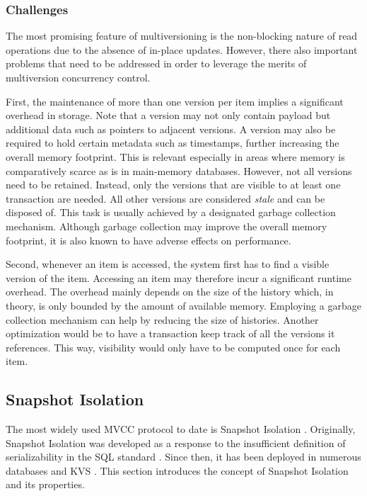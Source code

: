 \subsubsection{Challenges}

The most promising feature of multiversioning is the non-blocking nature of read
operations due to the absence of in-place updates. However, there also important
problems that need to be addressed in order to leverage the merits of
multiversion concurrency control.

First, the maintenance of more than one version per item implies a significant
overhead in storage. Note that a version may not only contain payload but
additional data such as pointers to adjacent versions. A version may also be
required to hold certain metadata such as timestamps, further increasing the
overall memory footprint. This is relevant especially in areas where memory is
comparatively scarce as is in main-memory databases. However, not all versions
need to be retained. Instead, only the versions that are visible to at least one
transaction are needed. All other versions are considered \emph{stale} and can
be disposed of. This task is usually achieved by a designated garbage collection
mechanism. Although garbage collection may improve the overall memory footprint,
it is also known to have adverse effects on performance.

Second, whenever an item is accessed, the system first has to find a visible
version of the item. Accessing an item may therefore incur a significant runtime
overhead. The overhead mainly depends on the size of the history which, in
theory, is only bounded by the amount of available memory. Employing a garbage
collection mechanism can help by reducing the size of histories. Another
optimization would be to have a transaction keep track of all the versions it
references. This way, visibility would only have to be computed once for each
item.

\subsection{Snapshot Isolation}

The most widely used MVCC protocol to date is Snapshot Isolation
\cite{larson2011high, neumann2015fast}. Originally, Snapshot Isolation was
developed as a response to the insufficient definition of serializability in the
SQL standard \cite{berenson1995critique}. Since then, it has been deployed in
numerous databases and KVS \cite{cahill2009serializable, wu2017empirical}. This
section introduces the concept of Snapshot Isolation and its properties.

